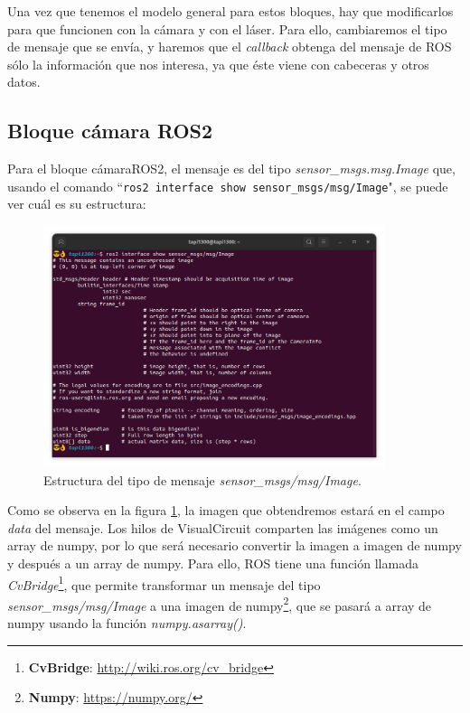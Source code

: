 Una vez que tenemos el modelo general para estos bloques, hay que modificarlos para que funcionen con la cámara y con el láser. Para ello,
cambiaremos el tipo de mensaje que se envía, y haremos que el \textit{callback} obtenga del mensaje de ROS sólo la información que nos interesa,
ya que éste viene con cabeceras y otros datos.\\

\subsection{Bloque cámara ROS2}
\label{subsec:cameraROS2}

Para el bloque cámaraROS2, el mensaje es del tipo \textit{sensor\_msgs.msg.Image} que,
usando el comando ``\lstinline|ros2 interface show sensor_msgs/msg/Image|", se puede ver cuál es su estructura:
\begin{figure} [H]
  \begin{center}
      \includegraphics[width=10cm]{figs/c4/image_struct.png}
  \end{center}
  \caption[Estructura mensaje Image]{Estructura del tipo de mensaje \textit{sensor\_msgs/msg/Image}.}
  \label{fig:image_struct}
\end{figure}
Como se observa en la figura \ref{fig:image_struct}, la imagen que obtendremos estará en el campo \textit{data} del mensaje. Los hilos de VisualCircuit
comparten las imágenes como un array de numpy, por lo que será necesario convertir la imagen a imagen de numpy y después a un array de numpy.
Para ello, ROS tiene una función llamada \textit{CvBridge}\footnote{\textbf{CvBridge}: \url{http://wiki.ros.org/cv_bridge}}, que permite transformar un mensaje del
tipo \textit{sensor\_msgs/msg/Image} a una imagen de numpy\footnote{\textbf{Numpy}: \url{https://numpy.org/}}, que se pasará a array de numpy usando la
función \textit{numpy.asarray()}.
